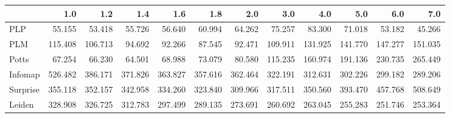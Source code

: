 \begin{tabular}{lrrrrrrrrrrr}
\toprule
{} &     1.0 &     1.2 &     1.4 &     1.6 &     1.8 &     2.0 &     3.0 &     4.0 &     5.0 &     6.0 &     7.0 \\
\midrule
PLP      &  55.155 &  53.418 &  55.726 &  56.640 &  60.994 &  64.262 &  75.257 &  83.300 &  71.018 &  53.182 &  45.266 \\
PLM      & 115.408 & 106.713 &  94.692 &  92.266 &  87.545 &  92.471 & 109.911 & 131.925 & 141.770 & 147.277 & 151.035 \\
Potts    &  67.254 &  66.230 &  64.501 &  68.988 &  73.079 &  80.580 & 115.235 & 160.974 & 191.136 & 230.735 & 265.449 \\
Infomap  & 526.482 & 386.171 & 371.826 & 363.827 & 357.616 & 362.464 & 322.191 & 312.631 & 302.226 & 299.182 & 289.206 \\
Surprise & 355.118 & 352.157 & 342.958 & 334.260 & 323.840 & 309.966 & 317.511 & 350.560 & 393.470 & 457.768 & 508.649 \\
Leiden   & 328.908 & 326.725 & 312.783 & 297.499 & 289.135 & 273.691 & 260.692 & 263.045 & 255.283 & 251.746 & 253.364 \\
\bottomrule
\end{tabular}
